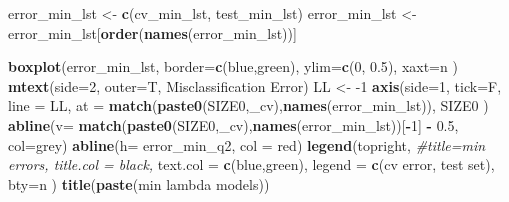 \documentclass[
]{book}
\newenvironment{Shaded}{\begin{snugshade}}{\end{snugshade}}
\newcommand{\CommentTok}[1]{\textcolor[rgb]{0.56,0.35,0.01}{\textit{#1}}}
\newcommand{\DataTypeTok}[1]{\textcolor[rgb]{0.13,0.29,0.53}{#1}}
\newcommand{\DecValTok}[1]{\textcolor[rgb]{0.00,0.00,0.81}{#1}}
\newcommand{\FloatTok}[1]{\textcolor[rgb]{0.00,0.00,0.81}{#1}}
\newcommand{\KeywordTok}[1]{\textcolor[rgb]{0.13,0.29,0.53}{\textbf{#1}}}
\newcommand{\NormalTok}[1]{#1}
\newcommand{\OperatorTok}[1]{\textcolor[rgb]{0.81,0.36,0.00}{\textbf{#1}}}
\newcommand{\StringTok}[1]{\textcolor[rgb]{0.31,0.60,0.02}{#1}}
\begin{document}
\begin{Shaded}
\begin{Highlighting}[]
\NormalTok{error\_min\_lst <{-}}\StringTok{ }\KeywordTok{c}\NormalTok{(cv\_min\_lst, test\_min\_lst)}
\NormalTok{error\_min\_lst <{-}}\StringTok{ }\NormalTok{error\_min\_lst[}\KeywordTok{order}\NormalTok{(}\KeywordTok{names}\NormalTok{(error\_min\_lst))]}

\KeywordTok{boxplot}\NormalTok{(error\_min\_lst, }
  \DataTypeTok{border=}\KeywordTok{c}\NormalTok{(}\StringTok{\textquotesingle{}blue\textquotesingle{}}\NormalTok{,}\StringTok{\textquotesingle{}green\textquotesingle{}}\NormalTok{), }
  \DataTypeTok{ylim=}\KeywordTok{c}\NormalTok{(}\DecValTok{0}\NormalTok{, }\FloatTok{0.5}\NormalTok{),}
  \DataTypeTok{xaxt=}\StringTok{\textquotesingle{}n\textquotesingle{}}
\NormalTok{)}
\KeywordTok{mtext}\NormalTok{(}\DataTypeTok{side=}\DecValTok{2}\NormalTok{, }\DataTypeTok{outer=}\NormalTok{T,  }\StringTok{\textquotesingle{}Misclassification Error\textquotesingle{}}\NormalTok{)}
\NormalTok{LL <{-}}\StringTok{ }\DecValTok{{-}1}
\KeywordTok{axis}\NormalTok{(}\DataTypeTok{side=}\DecValTok{1}\NormalTok{, }\DataTypeTok{tick=}\NormalTok{F, }\DataTypeTok{line =}\NormalTok{ LL,}
  \DataTypeTok{at =} \KeywordTok{match}\NormalTok{(}\KeywordTok{paste0}\NormalTok{(SIZE0,}\StringTok{\textquotesingle{}\_cv\textquotesingle{}}\NormalTok{),}\KeywordTok{names}\NormalTok{(error\_min\_lst)), }
\NormalTok{  SIZE0}
\NormalTok{ )}
\KeywordTok{abline}\NormalTok{(}\DataTypeTok{v=} \KeywordTok{match}\NormalTok{(}\KeywordTok{paste0}\NormalTok{(SIZE0,}\StringTok{\textquotesingle{}\_cv\textquotesingle{}}\NormalTok{),}\KeywordTok{names}\NormalTok{(error\_min\_lst))[}\OperatorTok{{-}}\DecValTok{1}\NormalTok{] }\OperatorTok{{-}}\StringTok{ }\FloatTok{0.5}\NormalTok{, }\DataTypeTok{col=}\StringTok{\textquotesingle{}grey\textquotesingle{}}\NormalTok{)}
\KeywordTok{abline}\NormalTok{(}\DataTypeTok{h=}\NormalTok{ error\_min\_q2, }\DataTypeTok{col =} \StringTok{\textquotesingle{}red\textquotesingle{}}\NormalTok{)}
\KeywordTok{legend}\NormalTok{(}\StringTok{\textquotesingle{}topright\textquotesingle{}}\NormalTok{, }
   \CommentTok{\#title=\textquotesingle{}min errors\textquotesingle{}, title.col = \textquotesingle{}black\textquotesingle{},}
   \DataTypeTok{text.col =} \KeywordTok{c}\NormalTok{(}\StringTok{\textquotesingle{}blue\textquotesingle{}}\NormalTok{,}\StringTok{\textquotesingle{}green\textquotesingle{}}\NormalTok{),}
   \DataTypeTok{legend =} \KeywordTok{c}\NormalTok{(}\StringTok{\textquotesingle{}cv error\textquotesingle{}}\NormalTok{, }\StringTok{\textquotesingle{}test set\textquotesingle{}}\NormalTok{),}
   \DataTypeTok{bty=}\StringTok{\textquotesingle{}n\textquotesingle{}}
\NormalTok{ )}
\KeywordTok{title}\NormalTok{(}\KeywordTok{paste}\NormalTok{(}\StringTok{\textquotesingle{}min lambda models\textquotesingle{}}\NormalTok{))}


\end{Highlighting}
\end{Shaded}
\end{document}
